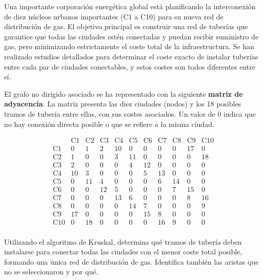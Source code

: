

Una importante corporación energética global está planificando la interconexión de diez núcleos urbanos importantes (C1 a C10) para su nueva red de distribución de gas. El objetivo principal es construir una red de tuberías que garantice que todas las ciudades estén conectadas y puedan recibir suministro de gas, pero minimizando estrictamente el coste total de la infraestructura. Se han realizado estudios detallados para determinar el coste exacto de instalar tuberías entre cada par de ciudades conectables, y estos costes son todos diferentes entre sí.

El grafo no dirigido asociado se ha representado con la siguiente \textbf{matriz de adyacencia}. La matriz presenta las diez ciudades (nodos) y los 18 posibles tramos de tubería entre ellas, con sus costes asociados. Un valor de 0 indica que no hay conexión directa posible o que se refiere a la misma ciudad.

$$
\begin{array}{c|cccccccccc}
& \text{C1} & \text{C2} & \text{C3} & \text{C4} & \text{C5} & \text{C6} & \text{C7} & \text{C8} & \text{C9} & \text{C10} \\
\hline
\text{C1} & 0 & 1 & 2 & 10 & 0 & 0 & 0 & 0 & 17 & 0 \\
\text{C2} & 1 & 0 & 0 & 3 & 11 & 0 & 0 & 0 & 0 & 18 \\
\text{C3} & 2 & 0 & 0 & 0 & 4 & 12 & 0 & 0 & 0 & 0 \\
\text{C4} & 10 & 3 & 0 & 0 & 0 & 5 & 13 & 0 & 0 & 0 \\
\text{C5} & 0 & 11 & 4 & 0 & 0 & 0 & 6 & 14 & 0 & 0 \\
\text{C6} & 0 & 0 & 12 & 5 & 0 & 0 & 0 & 7 & 15 & 0 \\
\text{C7} & 0 & 0 & 0 & 13 & 6 & 0 & 0 & 0 & 8 & 16 \\
\text{C8} & 0 & 0 & 0 & 0 & 14 & 7 & 0 & 0 & 0 & 9 \\
\text{C9} & 17 & 0 & 0 & 0 & 0 & 15 & 8 & 0 & 0 & 0 \\
\text{C10} & 0 & 18 & 0 & 0 & 0 & 0 & 16 & 9 & 0 & 0 \\
\end{array}
$$

Utilizando el algoritmo de Kruskal, determina qué tramos de tubería deben instalarse para conectar todas las ciudades con el menor coste total posible, formando una única red de distribución de gas. Identifica también las aristas que no se seleccionaron y por qué.
